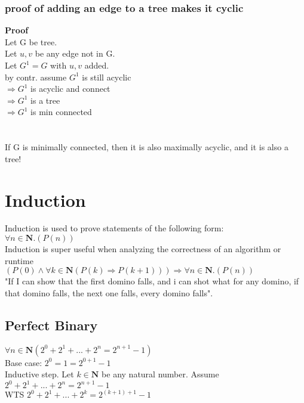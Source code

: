 \documentclass{article}
\begin{document}
\subsubsection{proof of adding an edge to a tree makes it cyclic}

\textbf{Proof}\\
Let G be tree. \\
Let ${u, v}$ be any edge not in G.\\
Let $G^1 = G$ with ${u, v}$ added. \\
by contr. assume $G^1$ is still acyclic \\
$\Rightarrow G^1$ is acyclic and connect \\
$\Rightarrow G^1$ is a tree \\
$\Rightarrow G^1$ is min connected \\ \\ \\
If G is minimally connected, then it is also maximally acyclic, and it is also a tree! \\
\section{Induction}
Induction is used to prove statements of the following form: \\
$\forall n \in \mathbf{N}. (P(n))$\\
Induction is super useful when analyzing the correctness of an algorithm or runtime\\
$(P(0) \land \forall k \in \mathbf{N} (P(k) \Rightarrow P(k + 1))) \Rightarrow \forall n \in \mathbf{N}. (P(n))$ \\
"If I can show that the first domino falls, and i can shot what for any domino, if that domino falls, the next one falls, every domino falls".\\
\subsection{Perfect Binary}
$\forall n \in \mathbf{N} (2^0 + 2^1 + ... + 2^n = 2^{n+1} -1)$\\
Base case: $2^0 = 1 = 2^{0 + 1} - 1$\\
Inductive step. Let $k \in \mathbf{N}$ be any natural number. Assume $2^0 + 2^1 + ... + 2^n = 2^{n+1} -1 $\\
WTS $2^0 + 2^1 + ... + 2^k = 2^{(k+1) + 1} -1$\\ \\
\end{document}
